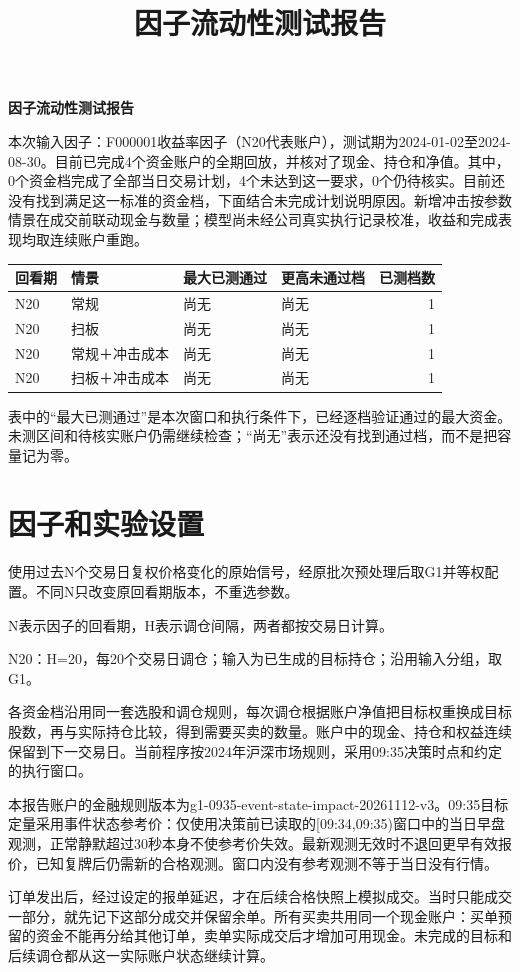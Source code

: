 \documentclass[UTF8,10pt,a4paper,fontset=fandol]{ctexart}
\title{因子流动性测试报告}\date{}\author{}
\begin{document}
{\Large\bfseries 因子流动性测试报告}\par
本次输入因子：F000001收益率因子（N20代表账户），测试期为2024-01-02至2024-08-30。目前已完成4个资金账户的全期回放，并核对了现金、持仓和净值。其中，0个资金档完成了全部当日交易计划，4个未达到这一要求，0个仍待核实。目前还没有找到满足这一标准的资金档，下面结合未完成计划说明原因。新增冲击按参数情景在成交前联动现金与数量；模型尚未经公司真实执行记录校准，收益和完成表现均取连续账户重跑。

\begin{table}[H]\centering\small
\begin{tabular}{llllr}\toprule
回看期 & 情景 & 最大已测通过 & 更高未通过档 & 已测档数\\\midrule
N20 & 常规 & 尚无 & 尚无 & 1 \\
N20 & 扫板 & 尚无 & 尚无 & 1 \\
N20 & 常规＋冲击成本 & 尚无 & 尚无 & 1 \\
N20 & 扫板＋冲击成本 & 尚无 & 尚无 & 1 \\
\bottomrule\end{tabular}
\end{table}
表中的“最大已测通过”是本次窗口和执行条件下，已经逐档验证通过的最大资金。未测区间和待核实账户仍需继续检查；“尚无”表示还没有找到通过档，而不是把容量记为零。



\section*{因子和实验设置}
使用过去N个交易日复权价格变化的原始信号，经原批次预处理后取G1并等权配置。不同N只改变原回看期版本，不重选参数。

N表示因子的回看期，H表示调仓间隔，两者都按交易日计算。

N20：H=20，每20个交易日调仓；输入为已生成的目标持仓；沿用输入分组，取G1。

各资金档沿用同一套选股和调仓规则，每次调仓根据账户净值把目标权重换成目标股数，再与实际持仓比较，得到需要买卖的数量。账户中的现金、持仓和权益连续保留到下一交易日。当前程序按2024年沪深市场规则，采用09:35决策时点和约定的执行窗口。

本报告账户的金融规则版本为g1-0935-event-state-impact-20261112-v3。09:35目标定量采用事件状态参考价：仅使用决策前已读取的[09:34,09:35)窗口中的当日早盘观测，正常静默超过30秒本身不使参考价失效。最新观测无效时不退回更早有效报价，已知复牌后仍需新的合格观测。窗口内没有参考观测不等于当日没有行情。

订单发出后，经过设定的报单延迟，才在后续合格快照上模拟成交。当时只能成交一部分，就先记下这部分成交并保留余单。所有买卖共用同一个现金账户：买单预留的资金不能再分给其他订单，卖单实际成交后才增加可用现金。未完成的目标和后续调仓都从这一实际账户状态继续计算。
\end{document}
